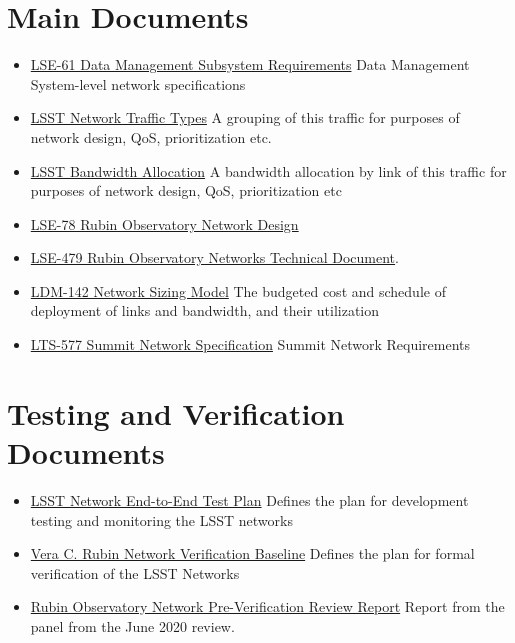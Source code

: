 
\section{Main Documents}

\begin{itemize}
    \item \href{https://confluence.lsstcorp.org/download/attachments/20284335/LSE-61.pdf?version=1&modificationDate=1490879770000&api=v2}{LSE-61 Data Management Subsystem Requirements} Data Management System-level network specifications 
    \item \href{https://confluence.lsstcorp.org/display/DM/LSST+Network+Traffic+Types}{LSST Network Traffic Types} A grouping of this traffic for purposes of network design, QoS, prioritization etc.
    \item \href{https://confluence.lsstcorp.org/display/DM/LSST+Network+Bandwidth+Allocation}{LSST Bandwidth Allocation} A bandwidth allocation by link of this traffic for purposes of network design, QoS, prioritization etc
    \item  \href{https://ls.st/lse-78}{LSE-78 Rubin Observatory Network Design}
    \item \href{https://ls.st/lse-479}{LSE-479 Rubin Observatory Networks Technical Document}.
    \item  \href{https://confluence.lsstcorp.org/download/attachments/20284335/20170130%20LDM-142%20LSST%20Networks%20BL%20and%20Plan.xls?version=1&modificationDate=1491479508000&api=v2}{LDM-142 Network Sizing Model} The budgeted cost and schedule of deployment of links and bandwidth, and their utilization
    \item \href{https://ls.st/lts-577}{LTS-577 Summit Network Specification} Summit Network Requirements
\end{itemize}

\section{Testing and Verification Documents}

\begin{itemize}
    \item \href{https://confluence.lsstcorp.org/download/attachments/20284335/LSST%20LHN%20End-to-End_Plan_v6.docx?version=1&modificationDate=1490879785000&api=v2}{LSST Network End-to-End Test Plan} Defines the plan for development 
    testing and monitoring the LSST networks
    \item \href{https://docushare.lsstcorp.org/docushare/dsweb/Get/LDM-732/NoContent8135677362395171770.txt}{Vera C. Rubin Network Verification Baseline} Defines the plan for formal verification of the LSST Networks
    \item \href{https://docushare.lsstcorp.org/docushare/dsweb/Get/Document-35934/Rubin%20Observatory%20Networks%20Pre-Verification%20Review%20Report%202020-06-22.pdf}{Rubin Observatory Network Pre-Verification Review Report} Report from the panel from the June 2020 review.
\end{itemize}

